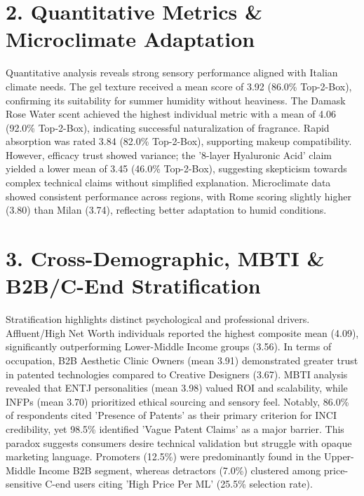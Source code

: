 \documentclass[10pt,twocolumn,a4paper]{article}
\begin{document}
\section{2. Quantitative Metrics \& Microclimate Adaptation}
Quantitative analysis reveals strong sensory performance aligned with Italian climate needs. The gel texture received a mean score of 3.92 (86.0\% Top-2-Box), confirming its suitability for summer humidity without heaviness. The Damask Rose Water scent achieved the highest individual metric with a mean of 4.06 (92.0\% Top-2-Box), indicating successful naturalization of fragrance. Rapid absorption was rated 3.84 (82.0\% Top-2-Box), supporting makeup compatibility. However, efficacy trust showed variance; the '8-layer Hyaluronic Acid' claim yielded a lower mean of 3.45 (46.0\% Top-2-Box), suggesting skepticism towards complex technical claims without simplified explanation. Microclimate data showed consistent performance across regions, with Rome scoring slightly higher (3.80) than Milan (3.74), reflecting better adaptation to humid conditions.
\section{3. Cross-Demographic, MBTI \& B2B/C-End Stratification}
Stratification highlights distinct psychological and professional drivers. Affluent/High Net Worth individuals reported the highest composite mean (4.09), significantly outperforming Lower-Middle Income groups (3.56). In terms of occupation, B2B Aesthetic Clinic Owners (mean 3.91) demonstrated greater trust in patented technologies compared to Creative Designers (3.67). MBTI analysis revealed that ENTJ personalities (mean 3.98) valued ROI and scalability, while INFPs (mean 3.70) prioritized ethical sourcing and sensory feel. Notably, 86.0\% of respondents cited 'Presence of Patents' as their primary criterion for INCI credibility, yet 98.5\% identified 'Vague Patent Claims' as a major barrier. This paradox suggests consumers desire technical validation but struggle with opaque marketing language. Promoters (12.5\%) were predominantly found in the Upper-Middle Income B2B segment, whereas detractors (7.0\%) clustered among price-sensitive C-end users citing 'High Price Per ML' (25.5\% selection rate).
\end{document}

